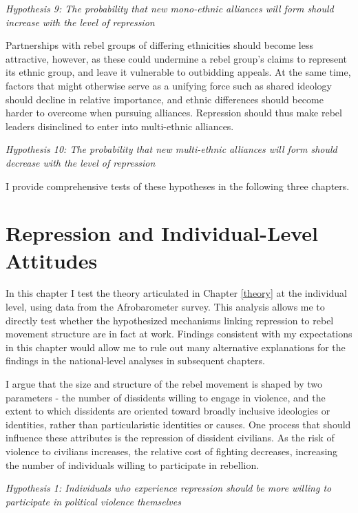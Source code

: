 \documentclass[12pt,]{book}
\theoremstyle{definition}
\theoremstyle{definition}
\theoremstyle{definition}
\theoremstyle{remark}
\begin{document}
\emph{Hypothesis 9: The probability that new mono-ethnic alliances will
form should increase with the level of repression}

Partnerships with rebel groups of differing ethnicities should become
less attractive, however, as these could undermine a rebel group's
claims to represent its ethnic group, and leave it vulnerable to
outbidding appeals. At the same time, factors that might otherwise serve
as a unifying force such as shared ideology should decline in relative
importance, and ethnic differences should become harder to overcome when
pursuing alliances. Repression should thus make rebel leaders
disinclined to enter into multi-ethnic alliances.

\emph{Hypothesis 10: The probability that new multi-ethnic alliances
will form should decrease with the level of repression}

I provide comprehensive tests of these hypotheses in the following three
chapters.

\hypertarget{survey-chapter}{%
\chapter{Repression and Individual-Level
Attitudes}\label{survey-chapter}}

In this chapter I test the theory articulated in Chapter \ref{theory} at
the individual level, using data from the Afrobarometer survey. This
analysis allows me to directly test whether the hypothesized mechanisms
linking repression to rebel movement structure are in fact at work.
Findings consistent with my expectations in this chapter would allow me
to rule out many alternative explanations for the findings in the
national-level analyses in subsequent chapters.

I argue that the size and structure of the rebel movement is shaped by
two parameters - the number of dissidents willing to engage in violence,
and the extent to which dissidents are oriented toward broadly inclusive
ideologies or identities, rather than particularistic identities or
causes. One process that should influence these attributes is the
repression of dissident civilians. As the risk of violence to civilians
increases, the relative cost of fighting decreases, increasing the
number of individuals willing to participate in rebellion.

\emph{Hypothesis 1: Individuals who experience repression should be more
willing to participate in political violence themselves}
\end{document}
